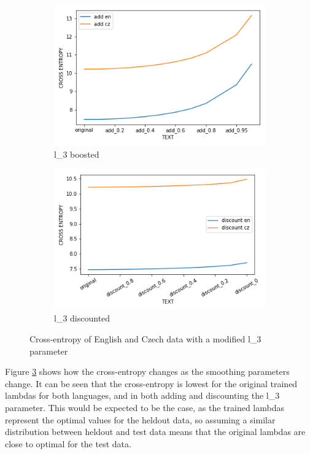 \documentclass[a4paper]{article}
\begin{document}
\begin{figure}[H]
	\centering
	\begin{subfigure}{\textwidth}
		\includegraphics[width=\textwidth]{figures/add_lm.png}
		\caption{l\_3 boosted}
		\label{fig:add_lm}
	\end{subfigure}
	\hfill
	\begin{subfigure}{\textwidth}
		\includegraphics[width=\textwidth]{figures/discount_lm.png}
		\caption{l\_3 discounted}
		\label{fig:discount_lm}
	\end{subfigure}
	\caption{Cross-entropy of English and Czech data with a modified l\_3
	parameter}
	\label{fig:tweaked_lm}
\end{figure}

Figure \ref{fig:tweaked_lm} shows how the cross-entropy changes as the smoothing
parameters change. It can be seen that the cross-entropy is lowest for the
original trained lambdas for both languages, and in both adding and discounting
the l\_3 parameter. This would be expected to be the case, as the trained
lambdas represent the optimal values for the heldout data, so assuming a similar
distribution between heldout and test data means that the original lambdas are
close to optimal for the test data.
\end{document}

